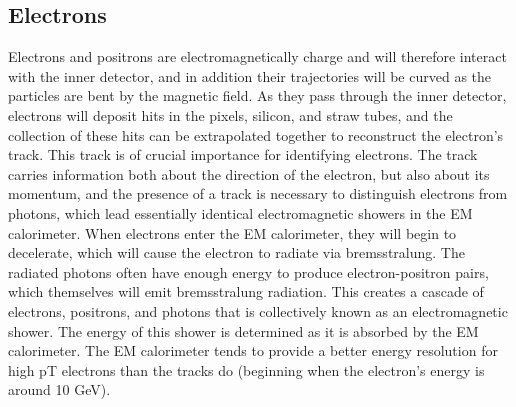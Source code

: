 


\subsection{Electrons}
Electrons and positrons are electromagnetically charge and will therefore interact with the inner detector, and in addition their trajectories will be curved as the particles are bent by the magnetic field.
As they pass through the inner detector, electrons will deposit hits in the pixels, silicon, and straw tubes, and the collection of these hits can be extrapolated together to reconstruct the electron's track.
This track is of crucial importance for identifying electrons.
The track carries information both about the direction of the electron, but also about its momentum, and the presence of a track is necessary to distinguish electrons from photons, which lead essentially identical electromagnetic showers in the EM calorimeter.
When electrons enter the EM calorimeter, they will begin to decelerate, which will cause the electron to radiate via bremsstralung.
The radiated photons often have enough energy to produce electron-positron pairs, which themselves will emit bremsstralung radiation.
This creates a cascade of electrons, positrons, and photons that is collectively known as an electromagnetic shower.
The energy of this shower is determined as it is absorbed by the EM calorimeter.
The EM calorimeter tends to provide a better energy resolution for high pT electrons than the tracks do (beginning when the electron's energy is around 10 GeV).

